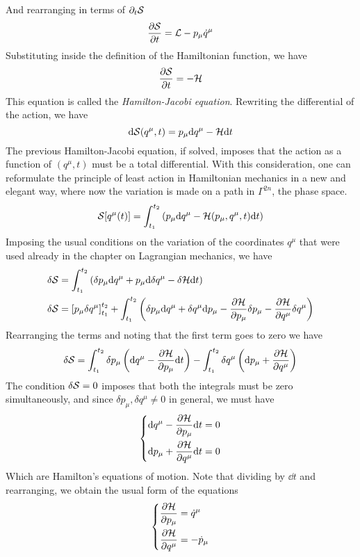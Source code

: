 \documentclass[../admech.tex]{subfiles}
\begin{document}
And rearranging in terms of $\partial_t\mathcal{S}$
\begin{equation*}
	\pdv{\mathcal{S}}{t}=\mathcal{L}-p_\mu\dot{q}^\mu
\end{equation*}
Substituting inside the definition of the Hamiltonian function, we have
\begin{equation}
	\pdv{\mathcal{S}}{t}=-\mathcal{H}
	\label{eq:hj1}
\end{equation}
This equation is called the \textit{Hamilton-Jacobi equation}. Rewriting the differential of the action, we have
\begin{equation*}
	\dd\mathcal{S}(q^\mu,t)=p_\mu\dd q^\mu-\mathcal{H}\dd t
\end{equation*}
The previous Hamilton-Jacobi equation, if solved, imposes that the action as a function of $(q^\mu,t)$ must be a total differential. With this consideration, one can reformulate the principle of least action in Hamiltonian mechanics in a new and elegant way, where now the variation is made on a path in $\Gamma^{2n}$, the phase space.\\
\begin{equation}
	\mathcal{S}[q^\mu(t)]=\int_{t_1}^{t_2}\left( p_\mu\dd q^\mu-\mathcal{H}(p_\mu,q^\mu,t)\dd t \right)
	\label{eq:hamiltonaction}
\end{equation}
Imposing the usual conditions on the variation of the coordinates $q^\mu$ that were used already in the chapter on Lagrangian mechanics, we have
\begin{equation*}
	\begin{aligned}
		\delta\mathcal{S}&=\int_{t_1}^{t_2}\left( \delta p_\mu\dd q^\mu+p_\mu\dd\delta q^\mu-\delta\mathcal{H}\dd t \right)\\
		\delta\mathcal{S}&=\left[ p_\mu\delta q^\mu \right]^{t_2}_{t_1}+\int_{t_1}^{t_2}\left( \delta p_\mu\dd q^\mu+\delta q^\mu\dd p_\mu-\pdv{\mathcal{H}}{p_\mu}\delta p_\mu-\pdv{\mathcal{H}}{q^\mu}\delta q^\mu \right)
	\end{aligned}
\end{equation*}
Rearranging the terms and noting that the first term goes to zero we have
\begin{equation}
	\delta\mathcal{S}=\int_{t_1}^{t_2}\delta p_\mu\left( \dd q^\mu-\pdv{\mathcal{H}}{p_\mu}\dd t \right)-\int_{t_1}^{t_2}\delta q^\mu\left( \dd p_\mu+\pdv{\mathcal{H}}{q^\mu} \right)
	\label{eq:variationhamcomp}
\end{equation}
The condition $\delta\mathcal{S}=0$ imposes that both the integrals must be zero simultaneously, and since $\delta p_\mu, \delta q^\mu\ne0$ in general, we must have
\begin{equation}
	\left\{ \begin{aligned}
			\dd q^\mu-\pdv{\mathcal{H}}{p_\mu}\dd t&=0\\
			\dd p_\mu+\pdv{\mathcal{H}}{q^\mu}\dd t&=0
	\end{aligned}\right.
	\label{eq:hameq}
\end{equation}
Which are Hamilton's equations of motion. Note that dividing by $\dd t$ and rearranging, we obtain the usual form of the equations
\begin{equation*}
	\left\{ \begin{aligned}
			\pdv{\mathcal{H}}{p_\mu}&=\dot{q}^\mu\\
			\pdv{\mathcal{H}}{q^\mu}&=-\dot{p}_\mu
	\end{aligned}\right.
\end{equation*}
\end{document}
